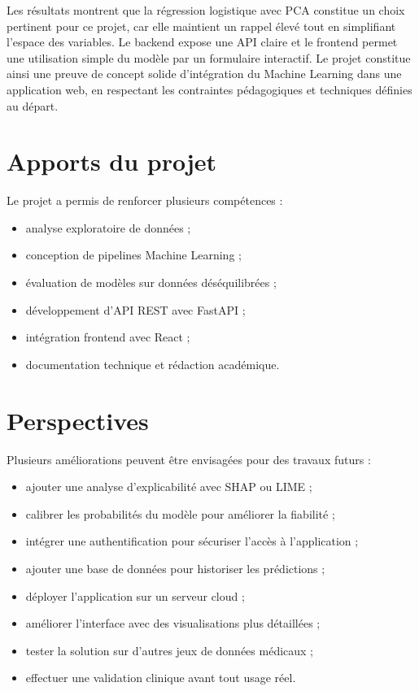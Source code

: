 \documentclass[12pt,a4paper]{report}
\begin{document}
Les résultats montrent que la régression logistique avec PCA constitue un choix pertinent pour ce projet, car elle maintient un rappel élevé tout en simplifiant l'espace des variables. Le backend expose une API claire et le frontend permet une utilisation simple du modèle par un formulaire interactif. Le projet constitue ainsi une preuve de concept solide d'intégration du Machine Learning dans une application web, en respectant les contraintes pédagogiques et techniques définies au départ.

\section{Apports du projet}
Le projet a permis de renforcer plusieurs compétences :
\begin{itemize}[label=--]
  \item analyse exploratoire de données ;
  \item conception de pipelines Machine Learning ;
  \item évaluation de modèles sur données déséquilibrées ;
  \item développement d'API REST avec FastAPI ;
  \item intégration frontend avec React ;
  \item documentation technique et rédaction académique.
\end{itemize}

\section{Perspectives}
Plusieurs améliorations peuvent être envisagées pour des travaux futurs :
\begin{itemize}[label=--]
  \item ajouter une analyse d'explicabilité avec SHAP ou LIME ;
  \item calibrer les probabilités du modèle pour améliorer la fiabilité ;
  \item intégrer une authentification pour sécuriser l'accès à l'application ;
  \item ajouter une base de données pour historiser les prédictions ;
  \item déployer l'application sur un serveur cloud ;
  \item améliorer l'interface avec des visualisations plus détaillées ;
  \item tester la solution sur d'autres jeux de données médicaux ;
  \item effectuer une validation clinique avant tout usage réel.
\end{itemize}
\end{document}
